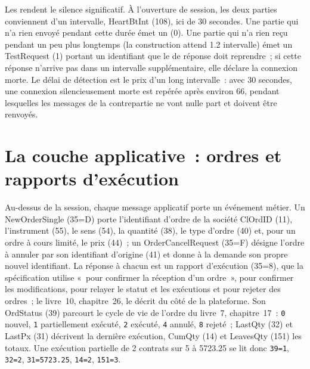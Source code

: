 \label{lst:ll:protocols-i-fix:trace}

Les  rendent le silence significatif. À l'ouverture de session, les deux parties conviennent d'un intervalle, HeartBtInt (108), ici de 30 secondes. Une partie qui n'a rien
envoyé pendant cette durée émet un  (0). Une partie qui n'a rien reçu pendant un peu plus longtemps (la construction attend 1.2
intervalle) émet un TestRequest (1) portant un identifiant que le  de réponse doit reprendre~; si cette réponse n'arrive pas dans un
intervalle supplémentaire, elle déclare la connexion morte. Le délai de détection est le prix d'un long intervalle~: avec 30 secondes, une connexion
silencieusement morte est repérée après environ 66, pendant lesquelles les messages de la contrepartie ne vont nulle part et doivent être
renvoyés.

\label{lst:ll:protocols-i-fix:seq}

\section{La couche applicative~: ordres et rapports d'exécution}

Au-dessus de la session, chaque message applicatif porte un événement métier. Un NewOrderSingle (35=D) porte l'identifiant d'ordre de la société
ClOrdID (11), l'instrument (55), le sens (54), la quantité (38), le type d'ordre (40) et, pour un ordre à cours limité, le prix (44)~; un OrderCancelRequest (35=F)
désigne l'ordre à annuler par son identifiant d'origine (41) et donne à la demande son propre nouvel identifiant. La réponse à chacun est un rapport d'exécution (35=8),
que la spécification utilise «~pour confirmer la réception d'un ordre~», pour confirmer les modifications, pour relayer le statut et les exécutions et pour rejeter des ordres~;
le livre~10, chapitre~26, le décrit du côté de la plateforme. Son OrdStatus (39) parcourt le cycle de vie de l'ordre du livre~7, chapitre~17~:
\texttt{0} nouvel, \texttt{1} partiellement exécuté, \texttt{2} exécuté, \texttt{4} annulé, \texttt{8} rejeté~; LastQty (32) et LastPx (31)
décrivent la dernière exécution, CumQty (14) et LeavesQty (151) les totaux.
Une exécution partielle de 2 contrats sur 5 à 5723.25 se lit donc
\texttt{39=1}, \texttt{32=2}, \texttt{31=5723.25}, \texttt{14=2}, \texttt{151=3}.

